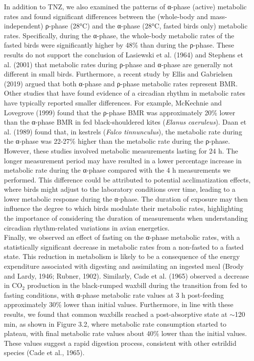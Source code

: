 \documentclass[10pt, twoside]{book} %
\begin{document}
In addition to TNZ, we also examined the patterns of α-phase (active) metabolic rates and found significant differences between the (whole-body and mass-independent) ρ-phase (28°C) and the α-phase (28°C, fasted birds only) metabolic rates. Specifically, during the α-phase, the whole-body metabolic rates of the fasted birds were significantly higher by 48\% than during the ρ-phase. These results do not support the conclusion of Lasiewski et al. (1964) and Stephens et al. (2001) that metabolic rates during ρ-phase and α-phase are generally not different in small birds. Furthermore, a recent study by Ellis and Gabrielsen (2019) argued that both α-phase and ρ-phase metabolic rates represent BMR. Other studies that have found evidence of a circadian rhythm in metabolic rates have typically reported smaller differences. For example, McKechnie and Lovegrove (1999) found that the ρ-phase BMR was approximately 20\% lower than the α-phase BMR in fed black-shouldered kites (\textit{Elanus caeruleus}). Daan et al. (1989) found that, in kestrels (\textit{Falco tinnunculus}), the metabolic rate during the α-phase was 22-27\% higher than the metabolic rate during the ρ-phase. However, these studies involved metabolic measurements lasting for 24 h. The longer measurement period may have resulted in a lower percentage increase in metabolic rate during the α-phase compared with the 4 h measurements we performed. This difference could be attributed to potential acclimatization effects, where birds might adjust to the laboratory conditions over time, leading to a lower metabolic response during the α-phase. The duration of exposure may then influence the degree to which birds modulate their metabolic rates, highlighting the importance of considering the duration of measurements when understanding circadian rhythm-related variations in avian energetics. \\

Finally, we observed an effect of fasting on the α-phase metabolic rates, with a statistically significant decrease in metabolic rates from a non-fasted to a fasted state. This reduction in metabolism is likely to be a consequence of the energy expenditure associated with digesting and assimilating an ingested meal (Brody and Lardy, 1946; Rubner, 1902). Similarly, Cade et al. (1965) observed a decrease in CO$_{\text{2}}$ production in the black-rumped waxbill during the transition from fed to fasting conditions, with α-phase metabolic rate values at 3 h post-feeding approximately 30\% lower than initial values. Furthermore, in line with these results, we found that common waxbills reached a post-absorptive state at $\sim$120 min, as shown in Figure 3.2, where metabolic rate consumption started to plateau, with final metabolic rate values about 40\% lower than the initial values. These values suggest a rapid digestion process, consistent with other estrildid species (Cade et al., 1965).\\
\end{document}
